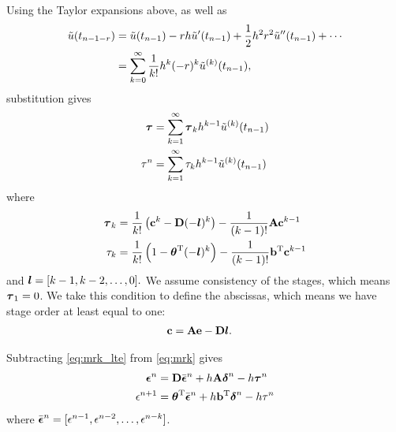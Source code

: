 Using the Taylor expansions above, as well as
\begin{align*}
\tilde{u}(t_{n-1-r}) & = \tilde{u}(t_{n-1}) - r h \tilde{u}'(t_{n-1}) + \frac{1}{2} h^2 r^2 \tilde{u}''(t_{n-1}) + \cdots \\
& = \sum_{k=0}^\infty \frac{1}{k!} h^k (-r)^k \tilde{u}^{(k)}(t_{n-1}),
\end{align*}
substitution gives
\begin{subequations} \label{eq:mrk_ste}
\begin{align}
\boldsymbol{\tau} & = \sum_{k=1}^\infty \boldsymbol{\tau}_k h^{k-1} \tilde{u}^{(k)}(t_{n-1}) \\
\tau^n & = \sum_{k=1}^\infty \tau_k h^{k-1} \tilde{u}^{(k)}(t_{n-1})
\end{align}
\end{subequations} 
where
\begin{subequations} 
\begin{align} \label{eq:mrk_ste_coeffs}
\boldsymbol{\tau}_k & = \frac{1}{k!} \left(\mathbf{c}^k-\mathbf{D}(-\boldsymbol{l})^k\right) - \frac{1}{(k-1)!} \mathbf{A} \mathbf{c}^{k-1} \\
\tau_k & = \frac{1}{k!}\left(1-\boldsymbol{\theta}^\mathrm{T}(-\boldsymbol{l})^k\right) - \frac{1}{(k-1)!} \mathbf{b}^\mathrm{T} \mathbf{c}^{k-1}
\label{eq:mrk_te_coeffs}
\end{align}
\end{subequations} 
and $\boldsymbol{l}=[k-1,k-2,\dots,0].$  We assume consistency of the stages, which
means $\boldsymbol{\tau}_1=0$.  We take this condition to define the abscissas, which means we
have stage order at least equal to one:
\begin{align} \label{eq:mrk_cdef} 
\mathbf{c} & = \mathbf{A}\mathbf{e} -\mathbf{D}\boldsymbol{l}.
\end{align}

Subtracting \eqref{eq:mrk_lte} from \eqref{eq:mrk} gives
\begin{subequations} \label{eq:mrk_gserr_series}
\begin{align}
\boldsymbol{\epsilon}^n & = \mathbf{D} \bar{\boldsymbol{\epsilon}}^n + h \mathbf{A} \boldsymbol{\delta}^n - h \boldsymbol{\tau}^n \\
\epsilon^{n+1} & = \boldsymbol{\theta}^\mathrm{T} \bar{\boldsymbol{\epsilon}}^n + h \mathbf{b}^\mathrm{T} \boldsymbol{\delta}^n - h \tau^n
\end{align}
\end{subequations}
where $\bar{\boldsymbol{\epsilon}}^n = [\epsilon^{n-1},\epsilon^{n-2},\dots,\epsilon^{n-k}]$.

